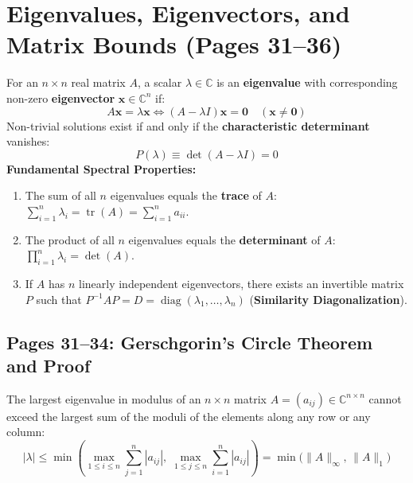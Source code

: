 \chapter{Eigenvalues, Eigenvectors, and Matrix Bounds (Pages 31--36)}
\label{ch:eigenvalues_bounds}

\begin{conceptbox}
For an $n \times n$ real matrix $A$, a scalar $\lambda \in \mathbb{C}$ is an \textbf{eigenvalue} with corresponding non-zero \textbf{eigenvector} $\mathbf{x} \in \mathbb{C}^n$ if:
\begin{equation}
    A \mathbf{x} = \lambda \mathbf{x} \iff (A - \lambda I)\mathbf{x} = \mathbf{0} \quad (\mathbf{x} \ne \mathbf{0})
\end{equation}
Non-trivial solutions exist if and only if the \textbf{characteristic determinant} vanishes:
\begin{equation}
    P(\lambda) \equiv \det(A - \lambda I) = 0
\end{equation}
\textbf{Fundamental Spectral Properties:}
\begin{enumerate}
    \item The sum of all $n$ eigenvalues equals the \textbf{trace} of $A$: $\sum_{i=1}^n \lambda_i = \operatorname{tr}(A) = \sum_{i=1}^n a_{ii}$.
    \item The product of all $n$ eigenvalues equals the \textbf{determinant} of $A$: $\prod_{i=1}^n \lambda_i = \det(A)$.
    \item If $A$ has $n$ linearly independent eigenvectors, there exists an invertible matrix $P$ such that $P^{-1} A P = D = \operatorname{diag}(\lambda_1, \dots, \lambda_n)$ (\textbf{Similarity Diagonalization}).
\end{enumerate}
\end{conceptbox}

\section{Pages 31--34: Gerschgorin's Circle Theorem and Proof}
\begin{theorembox}
The largest eigenvalue in modulus of an $n \times n$ matrix $A = (a_{ij}) \in \mathbb{C}^{n \times n}$ cannot exceed the largest sum of the moduli of the elements along any row or any column:
\begin{equation}
    \boxed{|\lambda| \le \min\left( \max_{1 \le i \le n} \sum_{j=1}^n |a_{ij}|, \; \max_{1 \le j \le n} \sum_{i=1}^n |a_{ij}| \right) = \min\big( \|A\|_\infty, \, \|A\|_1 \big)}
\end{equation}
\end{theorembox}


